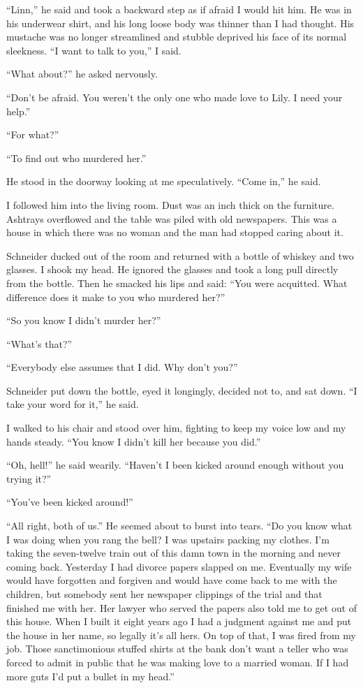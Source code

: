 \documentclass{novel}
\begin{document}
“Linn,” he said and took a backward step as if afraid I would hit him. He was in his underwear shirt, and his long loose body was thinner than I had thought. His mustache was no longer streamlined and stubble deprived his face of its normal sleekness. “I want to talk to you,” I said.

“What about?” he asked nervously.

“Don’t be afraid. You weren’t the only one who made love to Lily. I need your help.”

“For what?”

“To find out who murdered her.”

He stood in the doorway looking at me speculatively. “Come in,” he said.

I followed him into the living room. Dust was an inch thick on the furniture. Ashtrays overflowed and the table was piled with old newspapers. This was a house in which there was no woman and the man had stopped caring about it.

Schneider ducked out of the room and returned with a bottle of whiskey and two glasses. I shook my head. He ignored the glasses and took a long pull directly from the bottle. Then he smacked his lips and said: “You were acquitted. What difference does it make to you who murdered her?”

“So you know I didn’t murder her?”

“What’s that?”

“Everybody else assumes that I did. Why don’t you?”

Schneider put down the bottle, eyed it longingly, decided not to, and sat down. “I take your word for it,” he said.

I walked to his chair and stood over him, fighting to keep my voice low and my hands steady. “You know I didn’t kill her because you did.”

“Oh, hell!” he said wearily. “Haven’t I been kicked around enough without you trying it?”

“You’ve been kicked around!”

“All right, both of us.” He seemed about to burst into tears. “Do you know what I was doing when you rang the bell? I was upstairs packing my clothes. I’m taking the seven-twelve train out of this damn town in the morning and never coming back. Yesterday I had divorce papers slapped on me. Eventually my wife would have forgotten and forgiven and would have come back to me with the children, but somebody sent her newspaper clippings of the trial and that finished me with her. Her lawyer who served the papers also told me to get out of this house. When I built it eight years ago I had a judgment against me and put the house in her name, so legally it’s all hers. On top of that, I was fired from my job. Those sanctimonious stuffed shirts at the bank don’t want a teller who was forced to admit in public that he was making love to a married woman. If I had more guts I’d put a bullet in my head.”
\end{document}
